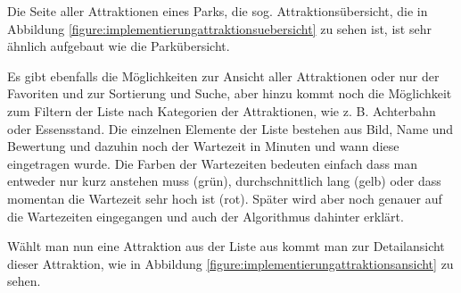 Die Seite aller Attraktionen eines Parks, die sog. Attraktionsübersicht, die in Abbildung \ref{figure:implementierungattraktionsuebersicht} zu sehen ist, ist sehr ähnlich aufgebaut wie die Parkübersicht. 

Es gibt ebenfalls die Möglichkeiten zur Ansicht aller Attraktionen oder nur der Favoriten und zur Sortierung und Suche, aber hinzu kommt noch die Möglichkeit zum Filtern der Liste nach Kategorien der Attraktionen, wie z. B. Achterbahn oder Essensstand. Die einzelnen Elemente der Liste bestehen aus Bild, Name und Bewertung und dazuhin noch der Wartezeit in Minuten und wann diese eingetragen wurde. Die Farben der Wartezeiten bedeuten einfach dass man entweder nur kurz anstehen muss (grün), durchschnittlich lang (gelb) oder dass momentan die Wartezeit sehr hoch ist (rot). Später wird aber noch genauer auf die Wartezeiten eingegangen und auch der Algorithmus dahinter erklärt. 

Wählt man nun eine Attraktion aus der Liste aus kommt man zur Detailansicht dieser Attraktion, wie in Abbildung \ref{figure:implementierungattraktionsansicht} zu sehen.

\newpage

